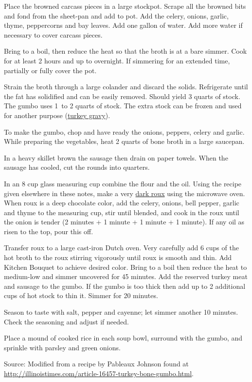 \documentclass[letterpaper]{recipePMG}
\newcommand{\half}{\nicefrac{1}{2} \,}
\begin{document}
Place the browned carcass pieces in a large stockpot. Scrape all the browned bits and fond from the sheet-pan and add to pot. Add the celery, onions, garlic, thyme, peppercorns and bay leaves. Add one gallon of water.  Add more water if necessary to cover carcass pieces. 

Bring to a boil, then reduce the heat so that the broth is at a bare simmer. Cook for at least 2 hours and up to overnight. If simmering for an extended time, partially or fully cover the pot. 

Strain the broth through a large colander and discard the solids. Refrigerate until the fat has solidified and can be easily removed. Should yield 3 quarts of stock.  The gumbo uses 1\half to 2 quarts of stock. The extra stock can be frozen and used for another purpose (\hyperref[TurkeyGravy]{turkey gravy}).

To make the gumbo, chop and have ready the onions, peppers, celery and garlic. While preparing the vegetables, heat 2 quarts of bone broth in a large saucepan. 

In a heavy skillet brown the sausage then drain on paper towels. When the sausage has cooled, cut the rounds into quarters.

In an 8 cup glass measuring cup combine the flour and the oil.  Using the recipe given elsewhere in these notes, make a very \hyperref[BrownRoux]{dark roux} using the microwave oven. When roux is a deep chocolate color, add the celery, onions, bell pepper, garlic and thyme to the measuring cup, stir until blended, and cook in the roux until the onion is tender (2 minutes + 1 minute + 1 minute + 1 minute). If any oil as risen to the top, pour this off.

Transfer roux to a large cast-iron Dutch oven. Very carefully add 6 cups of the hot broth to the roux stirring vigorously until roux is smooth and thin. Add Kitchen Bouquet to achieve desired color. Bring to a boil then reduce the heat to medium-low and simmer uncovered for 45 minutes. Add the reserved turkey meat and sausage to the gumbo.  If the gumbo is too thick then add up to 2 additional cups of hot stock to thin it. Simmer for 20 minutes.

Season to taste with salt, pepper and cayenne; let simmer another 10 minutes. Check the seasoning and adjust if needed.

Place a mound of cooked rice in each soup bowl, surround with the gumbo, and sprinkle with parsley and green onions.

Source: Modified from a recipe by Pableaux Johnson found at \url{http://illinoistimes.com/article-16457-turkey-bone-gumbo.html}.
\end{document}
